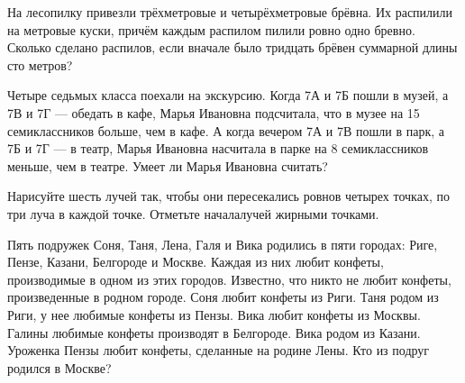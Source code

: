  На лесопилку привезли трёхметровые и четырёхметровые брёвна. Их распилили на метровые куски, причём каждым распилом пилили ровно одно бревно. Сколько сделано распилов, если вначале было тридцать брёвен суммарной длины сто метров?

\newpage

 Четыре седьмых класса поехали на экскурсию. Когда 7А и 7Б пошли в музей, а 7В и 7Г — обедать в кафе, Марья Ивановна подсчитала, что в музее на 15 семиклассников больше, чем в кафе. А когда вечером 7А и 7В пошли в парк, а 7Б и 7Г — в театр, Марья Ивановна насчитала в парке на 8 семиклассников меньше, чем в театре. Умеет ли Марья Ивановна считать? 

 Нарисуйте шесть лучей так, чтобы они пересекались ровнов четырех точках, по три луча в каждой точке. Отметьте началалучей жирными точками.

 Пять подружек Соня, Таня, Лена, Галя и Вика родились в пяти городах: Риге, Пензе, Казани, Белгороде и Москве. Каждая из них любит конфеты, производимые в одном из этих городов. Известно, что никто не любит конфеты, произведенные в родном городе. Соня любит конфеты из Риги. Таня родом из Риги, у нее любимые конфеты из Пензы. Вика любит конфеты из Москвы. Галины любимые конфеты производят в Белгороде. Вика родом из Казани. Уроженка Пензы любит конфеты, сделанные на родине Лены. Кто из подруг родился в Москве?

